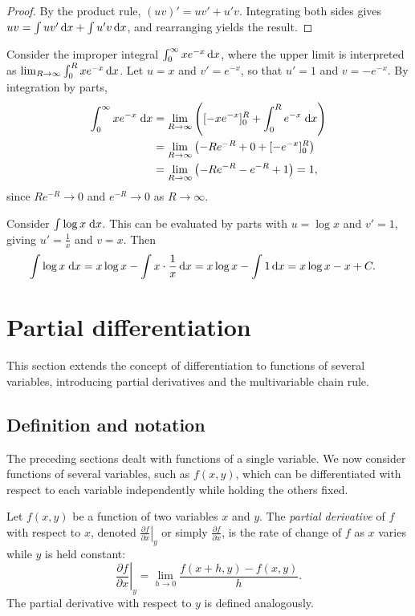 \documentclass[a4paper]{article}
\begin{document}
\begin{proof}
  By the product rule, $(uv)' = uv' + u'v$. Integrating both sides gives $uv = \int uv'\,\mathrm{d} x + \int u'v\,\mathrm{d} x$, and rearranging yields the result.
\end{proof}

\begin{eg}
  Consider the improper integral $\int_0^\infty xe^{-x}\,\mathrm{d} x$, where the upper limit is interpreted as $\lim_{R\to\infty}\int_0^R xe^{-x}\,\mathrm{d} x$. Let $u = x$ and $v' = e^{-x}$, so that $u' = 1$ and $v = -e^{-x}$. By integration by parts,
  \begin{align*}
    \int_0^\infty xe^{-x}\;\mathrm{d} x &= \lim_{R\to\infty}\left([-xe^{-x}]^R_0 + \int_0^R e^{-x} \;\mathrm{d} x\right)\\
    &= \lim_{R\to\infty}\left(-Re^{-R} + 0 + [-e^{-x}]_0^R\right)\\
    &= \lim_{R\to\infty}\left(-Re^{-R} - e^{-R} + 1\right) = 1,
  \end{align*}
  since $Re^{-R} \to 0$ and $e^{-R} \to 0$ as $R \to \infty$.
\end{eg}

\begin{eg}
  Consider $\int \log x\; \mathrm{d} x$. This can be evaluated by parts with $u = \log x$ and $v' = 1$, giving $u' = \frac{1}{x}$ and $v = x$. Then
  \begin{align*}
    \int \log x\; \mathrm{d} x &= x\log x - \int x \cdot \frac{1}{x}\,\mathrm{d} x = x\log x - \int 1\,\mathrm{d} x = x \log x - x + C.
  \end{align*}
\end{eg}

\section{Partial differentiation}
This section extends the concept of differentiation to functions of several variables, introducing partial derivatives and the multivariable chain rule.

\subsection{Definition and notation}
The preceding sections dealt with functions of a single variable. We now consider functions of several variables, such as $f(x, y)$, which can be differentiated with respect to each variable independently while holding the others fixed.

\begin{defi}
  Let $f(x, y)$ be a function of two variables $x$ and $y$. The \emph{partial derivative} of $f$ with respect to $x$, denoted $\left. \frac{\partial f}{\partial x}\right|_y$ or simply $\frac{\partial f}{\partial x}$, is the rate of change of $f$ as $x$ varies while $y$ is held constant:
  \[
    \left. \frac{\partial f}{\partial x}\right|_y = \lim_{h\to 0} \frac{f(x + h, y) - f(x, y)}{h}.
  \]
  The partial derivative with respect to $y$ is defined analogously.
\end{defi}
\end{document}
